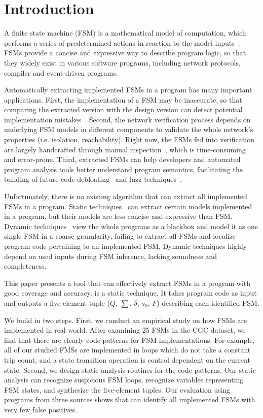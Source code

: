 \section{Introduction}

A finite state machine (FSM) is a mathematical model of computation, 
which performs a series of predetermined actions in 
reaction to the model inputs~\cite{fsm}. 
FSMs provide a concise and expressive way to describe
program logic, so that they widely exist in various software programs, 
including network protocols, 
compiler and event-driven programs. 

Automatically extracting implemented FSMs in a program has 
many important applications. 
First, the implementation of a FSM may be inaccurate, 
so that comparing the extracted version with the design version 
can detect potential implementation mistakes~\cite{protocol-bug}. 
Second, the network verification process depends on underlying FSM models 
in different components to validate the whole network’s properties 
(i.e. isolation, reachability).
Right now, the FSMs fed into verification are largely handcrafted through 
manual inspection~\cite{fayaz2016buzz,SymNet}, which is time-consuming and error-prone. 
Third, extracted FSMs can help developers and automated program analysis tools
better understand program semantics, facilitating the building of future 
code debloating~\cite{container-debloating-1,container-debloating-2,dinghao-1} 
and fuzz techniques~\cite{afl,Angora,youwei-1}.


Unfortunately, there is no existing algorithm that can extract 
all implemented FSMs in a program.
Static techniques~\cite{wu2016automatic,khalid2016paving} 
can extract certain models implemented in a program,
but their models are less concise and expressive than FSM. 
Dynamic techniques~\cite{angluin1987learning,moon2019alembic,cho2011mace} 
view the whole programs as a blackbox and 
model it as one single FSM in a coarse granularity, 
failing to extract all FSMs and localize program code 
pertaining to an implemented FSM. 
Dynamic techniques highly depend on used inputs during FSM inference, 
lacking soundness and completeness.  

This paper presents a tool \Tool{} that can effectively extract FSMs in a program
with good coverage and accuracy. 
\Tool{} is a static technique. 
It takes program code as input 
and outputs a five-element tuple ($Q$, $\sum$, $\delta$, $s_0$, $F$) 
describing each identified FSM. 


We build \Tool in two steps. First, we conduct an empirical study 
on how FSMs are implemented in real world. After examining 25 FSMs in the CGC 
dataset, we find that there are clearly code patterns for FSM implementations. 
For example, all of our studied FMSs are implemented in 
loops which do not take a constant trip count, and a state transition operation 
is control dependent on the current state. 
Second, we design static analysis routines for the code patterns.
Our static analysis can recognize suspicious FSM loops,
recognize variables representing FSM states, and synthesize the five-element tuples. 
Our evaluation using programs from three sources shows that
\Tool{} can identify all implemented FSMs with very few false positives. 


